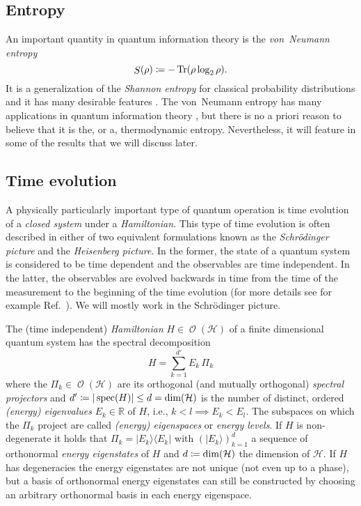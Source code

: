 \documentclass[a4paper,12pt,listof=totoc,index=totoc,bibliography=totoc,headsepline=false,headings=normal,BCOR16.153846mm,DIV12,headinclude,twoside,cleardoublepage=empty,numbers=noenddot,final]{scrreprt}
\theoremstyle{mystyle}
\numberwithin{equation}{section}
\numberwithin{figure}{section}
\numberwithin{lemma}{section}
\numberwithin{theorem}{section}
\numberwithin{corollary}{section}
\numberwithin{definition}{section}
\numberwithin{conjecture}{section}
\numberwithin{observation}{section}
\newcommand{\+}{\mkern2mu}
\newcommand{\coloneqq}{\mathrel{\vcentcolon\mkern-1.2mu=}} %
\renewcommand{\H}{H}
\newcommand{\bra}[1]{\langle #1|}
\newcommand{\ket}[1]{|#1\rangle}
\newcommand{\ketbra}[2]{\ket{#1}\!\bra{#2}}
\DeclareMathOperator{\1}{\mathds{1}}
\DeclareMathOperator{\Obs}{\mathcal{O}}
\DeclareMathOperator{\Svn}{\mathnormal{S}}
\DeclareMathOperator{\Tr}{Tr}
\DeclareMathOperator{\spec}{spec}
\newcommand{\mc}[1]{\mathcal{#1}}
\newcommand{\mcH}{\mc{H}}
\newcommand{\mb}[1]{\mathbb{#1}}
\newcommand{\R}{\mb{R}}
\begin{document}
\subsection{Entropy}
\label{sec:entropy}
%
An important quantity in quantum information theory is the \emph{von~Neumann entropy}
\begin{equation} \label{eq:vonneumannentropy}
  \Svn(\rho) \coloneqq - \Tr(\rho \log_2 \rho ) .
\end{equation}
It is a generalization of the \emph{Shannon entropy} for classical probability distributions and it has many desirable features \cite{thirringquantu}.
The von~Neumann entropy has many applications in quantum information theory \cite{nielsenchuang}, but there is no a priori reason to believe that it is the, or a, thermodynamic entropy.
Nevertheless, it will feature in some of the results that we will discuss later.


\subsection{Time evolution}
\label{sec:timeevolution}
%
A physically particularly important type of quantum operation is time evolution of a \emph{closed system} under a \emph{Hamiltonian}.
This type of time evolution is often described in either of two equivalent formulations known as the \emph{Schrödinger picture} and the \emph{Heisenberg picture}.
In the former, the state of a quantum system is considered to be time dependent and the observables are time independent.
In the latter, the observables are evolved backwards in time from the time of the measurement to the beginning of the time evolution (for more details see for example Ref.~\cite{Kliesch2013}).
We will mostly work in the Schrödinger picture.

The (time independent) \emph{Hamiltonian} $\H \in \Obs(\mcH)$ of a finite dimensional quantum system has the spectral decomposition
\begin{equation} \label{eq:hamiltonianspectraldecomposition}
  \H = \sum_{k=1}^{d'} E_k\,\Pi_k
\end{equation}
where the $\Pi_k \in \Obs(\mcH)$ are its orthogonal (and mutually orthogonal) \emph{spectral projectors} and $d' \coloneqq |\spec(\H)| \leq d = \dim(\mcH)$ is the number of distinct, ordered \emph{(energy) eigenvalues} $E_k \in \R$ of $\H$, i.e., $k<l \implies E_k < E_l$.
The subspaces on which the $\Pi_k$ project are called \emph{(energy) eigenspaces} or \emph{energy levels}.
If $\H$ is non-degenerate it holds that $\Pi_k = \ketbra{E_k}{E_k}$ with $(\ket{E_k})_{k=1}^d$ a sequence of orthonormal \emph{energy eigenstates} of $\H$ and $d \coloneqq \dim(\mcH)$ the dimension of $\mcH$.
If $\H$ has degeneracies the energy eigenstates are not unique (not even up to a phase), but a basis of orthonormal energy eigenstates can still be constructed by choosing an arbitrary orthonormal basis in each energy eigenspace.
\end{document}
